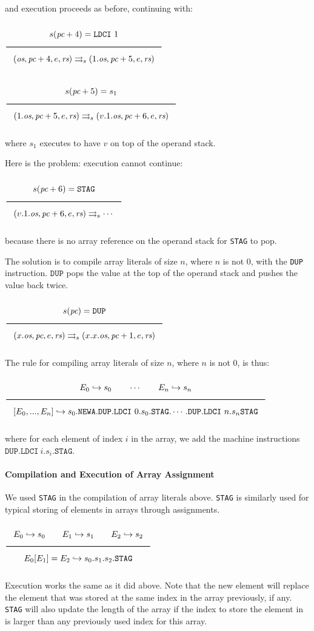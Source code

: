 and execution proceeds as before, continuing with:

$\Rule{s(\textit{pc}+4) = \texttt{LDCI}\ 1}{
(\textit{os},\textit{pc}+4,e,\textit{rs}) \transition
(1.\textit{os},\textit{pc}+5,e,\textit{rs})}
$

$\Rule{s(\textit{pc}+5) = s_1}{
(1.\textit{os},\textit{pc}+5,e,\textit{rs}) \transition
(v.1.\textit{os},\textit{pc}+6,e,\textit{rs})}
$

where $s_1$ executes to have $v$ on top of the operand stack.

Here is the problem: execution cannot continue:

$\Rule{s(\textit{pc}+6) = \texttt{STAG}}{
(v.1.\textit{os},\textit{pc}+6,e,\textit{rs}) \transition \cdots}
$

because there is no array reference on the operand stack for \texttt{STAG} to pop.

The solution is to compile array literals of size $n$, where $n$ is not $0$, with the \texttt{DUP} instruction.
$\texttt{DUP}$ pops the value at the top of the operand stack
and pushes the value back twice.

$\Rule{s(\textit{pc}) = \texttt{DUP}}{
(x.\textit{os},\textit{pc},e,\textit{rs}) \transition
(x.x.\textit{os},\textit{pc}+1,e,\textit{rs})}
$

The rule for compiling array literals of size $n$, where $n$ is not $0$, is thus:

$\Rule{E_0 \translateaux s_0 \qquad \cdots \qquad E_n \translateaux s_n}{
\lbrack E_0, ..., E_n\rbrack \translateaux s_0. \texttt{NEWA}
.\texttt{DUP}.\texttt{LDCI}\ 0.s_0.\texttt{STAG}. \cdots
.\texttt{DUP}.\texttt{LDCI}\ n.s_n\texttt{STAG}}
$

where for each element of index $i$ in the array, we add the machine instructions
$\texttt{DUP}.\texttt{LDCI}\ i.s_i.\texttt{STAG}$.

\paragraph{Compilation and Execution of Array Assignment}
We used \texttt{STAG} in the compilation of array literals
above. \texttt{STAG} is similarly used for typical storing of elements in
arrays through assignments.

$\Rule{
E_0 \translateaux s_0 \qquad E_1 \translateaux s_1 \qquad E_2 \translateaux s_2}
{E_0\lbrack E_1\rbrack = E_2 \translateaux s_0.s_1.s_2.\texttt{STAG}}
$

Execution works the same as it did above. Note that the new element will replace
the element that was stored at the same index in the array previously, if any.
\texttt{STAG} will also update the length of the array if the index to
store the element in is larger than any previously used index for this array.

